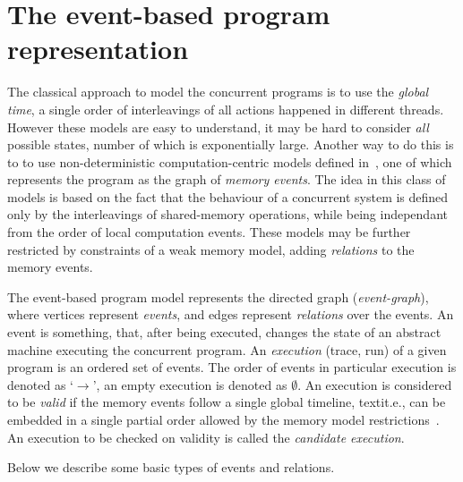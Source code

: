 
\section{The event-based program representation}
\label{ch:wmm:event}


The classical approach to model the concurrent programs is to use the \textit{global time}, a single order of interleavings of all actions happened in different threads. However these models are easy to understand, it may be hard to consider \textit{all} possible states, number of which is exponentially large. Another way to do this is to to use non-deterministic computation-centric models defined in~\cite{fri97}, one of which represents the program as the graph of \textit{memory events}. The idea in this class of models is based on the fact that the behaviour of a concurrent system is defined only by the interleavings of shared-memory operations, while being independant from the order of local computation events. These models may be further restricted by constraints of a weak memory model, adding \textit{relations} to the memory events.

The event-based program model represents the directed graph (\textit{event-graph}), where vertices represent \textit{events}, and edges represent \textit{relations} over the events. An event is something, that, after being executed, changes the state of an abstract machine executing the concurrent program. 
An \textit{execution} (trace, run) of a given program is an ordered set of events. The order of events in particular execution is denoted as `$\rightarrow$', an empty execution is denoted as $\emptyset$.
An execution is considered to be \textit{valid} if the memory events follow a single global timeline, textit.e., can be embedded in a single partial order allowed by the memory model restrictions~\cite{alglave2010shared}. An execution to be checked on validity is called the \textit{candidate execution}.

Below we describe some basic types of events and relations.

